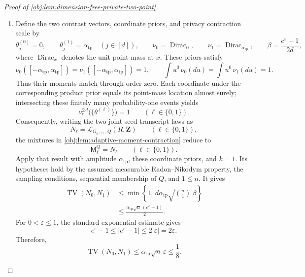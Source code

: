 \documentclass[11pt]{article}
\begin{document}
\begin{proof}[Proof of \cref{obj:lem:dimension-free-private-two-point}]
\begin{enumerate}
\item Define the two contrast vectors, coordinate priors, and privacy contraction scale by
\[
\theta^{(0)}_j=0,\qquad
\theta^{(1)}_j=\alpha_{\mathrm{tp}}
\quad(j\in[d]),
\qquad
\nu_0=\operatorname{Dirac}_0,\qquad
\nu_1=\operatorname{Dirac}_{\alpha_{\mathrm{tp}}},
\qquad
\beta=\frac{e^\varepsilon-1}{2d},
\]
where \(\operatorname{Dirac}_x\) denotes the unit point mass at \(x\).
These priors satisfy
\[
\nu_0([-\alpha_{\mathrm{tp}},\alpha_{\mathrm{tp}}])
=\nu_1([-\alpha_{\mathrm{tp}},\alpha_{\mathrm{tp}}])=1,
\qquad
\int u^0\,\nu_0(du)=\int u^0\,\nu_1(du)=1.
\]
Thus their moments match through order zero. Each coordinate under the corresponding product prior equals its point-mass location almost surely; intersecting these finitely many probability-one events yields
\[
\nu_\ell^{\otimes d}\bigl(\{\theta^{(\ell)}\}\bigr)=1
\qquad(\ell\in\{0,1\}).
\]
Consequently, writing the two joint seed-transcript laws as
\[
N_\ell=\mathcal L_{G_{\theta^{(\ell)}},Q}(R,\mathbf Z)
\qquad(\ell\in\{0,1\}),
\]
the mixtures in \cref{obj:lem:adaptive-moment-contraction} reduce to
\[
\mathsf M_\ell^Q=N_\ell
\qquad(\ell\in\{0,1\}).
\]
Apply that result with amplitude \(\alpha_{\mathrm{tp}}\), these coordinate priors, and \(k=1\). Its hypotheses hold by the assumed measurable Radon--Nikodym property, the sampling conditions, sequential membership of \(Q\), and \(1\le n\). It gives
\[
\begin{aligned}
\operatorname{TV}(N_0,N_1)
&\le
\min\left\{1,\,
d\alpha_{\mathrm{tp}}\sqrt{\binom n1}\,\beta\right\}\\
&\le
\frac{\alpha_{\mathrm{tp}}\sqrt n\,(e^\varepsilon-1)}2.
\end{aligned}
\]
For \(0<\varepsilon\le1\), the standard exponential estimate gives
\[
e^\varepsilon-1
\le |e^\varepsilon-1|
\le2|\varepsilon|
=2\varepsilon.
\]
Therefore,
\[
\operatorname{TV}(N_0,N_1)
\le\alpha_{\mathrm{tp}}\sqrt n\,\varepsilon
\le\frac18.
\]


\end{enumerate}
\end{proof}
\end{document}
